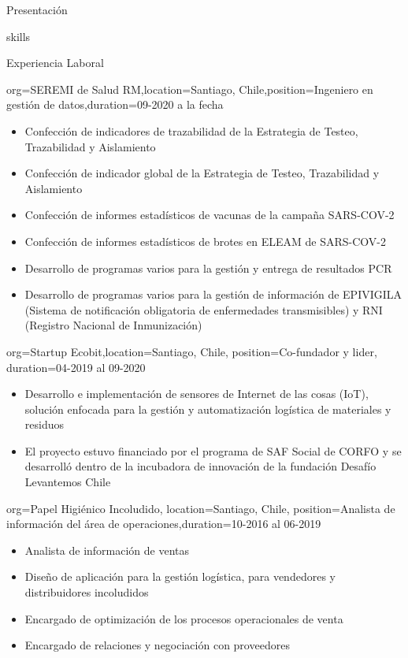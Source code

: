 \documentclass{resume}
\begin{document}
\begin{ResumeSection}{Presentación}
\begin{ResumeSection}{skills}
\begin{ResumeSection}{Experiencia Laboral}
    \begin{ResumeSubsection}{org=SEREMI de Salud RM,location={Santiago, Chile},position={Ingeniero en gestión de datos},duration=09-2020 a la fecha}
        \begin{itemize}
            \item Confección de indicadores de trazabilidad de la Estrategia de Testeo, Trazabilidad y Aislamiento
            \item Confección de indicador global de la Estrategia de Testeo, Trazabilidad y Aislamiento
            \item Confección de informes estadísticos de vacunas de la campaña SARS-COV-2
            \item Confección de informes estadísticos de brotes en ELEAM de SARS-COV-2
            \item Desarrollo de programas varios para la gestión y entrega de resultados PCR
            \item Desarrollo de programas varios para la gestión de información de EPIVIGILA (Sistema de notificación obligatoria de enfermedades transmisibles) y RNI (Registro Nacional de Inmunización)
        \end{itemize}
    \end{ResumeSubsection}

    \begin{ResumeSubsection}{org={Startup Ecobit},location={Santiago, Chile}, position={Co-fundador y lider}, duration={04-2019 al 09-2020}}
        \begin{itemize}
            \item Desarrollo e implementación de sensores de Internet de las cosas (IoT), solución enfocada para la gestión y automatización logística de materiales y residuos
            \item El proyecto estuvo financiado por el programa de SAF Social de CORFO y se desarrolló dentro de la incubadora de innovación de la fundación Desafío Levantemos Chile
        \end{itemize}
    \end{ResumeSubsection}

    \begin{ResumeSubsection}{org=Papel Higiénico Incoludido, location={Santiago, Chile}, position={Analista de información del área de operaciones},duration={10-2016 al 06-2019}}
        \begin{itemize}
            \item Analista de información de ventas
            \item Diseño de aplicación para la gestión logística, para vendedores y distribuidores incoludidos
            \item Encargado de optimización de los procesos operacionales de venta
            \item Encargado de relaciones y negociación con proveedores
            

\end{itemize}
\end{ResumeSubsection}
\end{ResumeSection}
\end{ResumeSection}
\end{ResumeSection}
\end{document}
